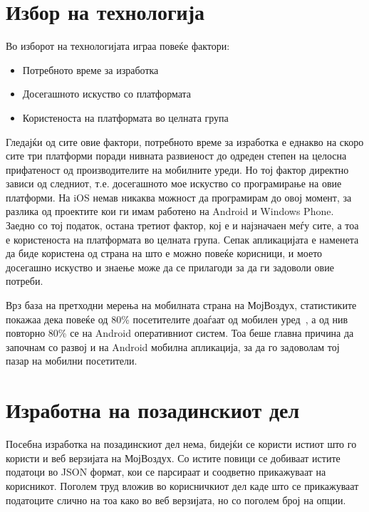 \documentclass{uvamscse}
\begin{document}
\section{Избор на технологија}

Во изборот на технологијата играа повеќе фактори:

\begin{itemize}
\item Потребното време за изработка
\item Досегашното искуство со платформата
\item Користеноста на платформата во целната група
\end{itemize}

Гледајќи од сите овие фактори, потребното време за изработка е еднакво на скоро сите три платформи поради нивната развиеност до одреден степен на целосна прифатеност од производителите на мобилните уреди. Но тој фактор директно зависи од следниот, т.е. досегашното мое искуство со програмирање на овие платформи. На iOS немав никаква можност да програмирам до овој момент, за разлика од проектите кои ги имам работено на Android и Windows Phone. Заедно со тој податок, остана третиот фактор, кој е и најзначаен меѓу сите, а тоа е користеноста на платформата во целната група. Сепак апликацијата е наменета да биде користена од страна на што е можно повеќе корисници, и моето досегашно искуство и знаење може да се прилагоди за да ги задоволи овие потреби. 
\vspace{5mm}


Врз база на претходни мерења на мобилната страна на МојВоздух, статистиките покажаа дека повеќе од 80\% посетителите доаѓаат од мобилен уред~\cite{mobusers}, а од нив повторно 80\% се на Android оперативниот систем. Тоа беше главна причина да започнам со развој и на Android мобилна апликација, за да го задоволам тој пазар на мобилни посетители.

\section{Изработна на позадинскиот дел}

Посебна изработка на позадинскиот дел нема, бидејќи се користи истиот што го користи и веб верзијата на МојВоздух. Со истите повици се добиваат истите податоци во JSON формат, кои се парсираат и соодветно прикажуваат на корисникот. Поголем труд вложив во корисничкиот дел каде што се прикажуваат податоците слично на тоа како во веб верзијата, но со поголем број на опции.
\end{document}
